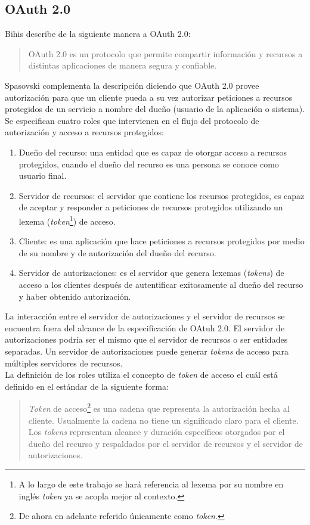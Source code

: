 \subsection{OAuth 2.0}\label{sec:oauth}
Bihis describe de la siguiente manera a OAuth 2.0:
\begin{quote}
	OAuth 2.0 es un protocolo que permite compartir información y recursos a distintas aplicaciones de manera segura y confiable\cite{MasteringOAuth2}.
\end{quote}
Spasovski complementa la descripción diciendo que OAuth 2.0 provee autorización para que un cliente pueda a su vez autorizar peticiones a recursos protegidos de un servicio a nombre del dueño (usuario de la aplicación o sistema)\cite{OAuth2Identity}.
Se especifican cuatro roles que intervienen en el flujo del protocolo de autorización y acceso a recursos protegidos\cite{OAuthRFC}:
\begin{enumerate}
	\item Dueño del recurso: una entidad que es capaz de otorgar acceso a recursos protegidos, cuando el dueño del recurso es una persona se conoce como usuario final.
	\item Servidor de recursos: el servidor que contiene los recursos protegidos, es capaz de aceptar y responder a peticiones de recursos protegidos utilizando un lexema (\textit{token}\footnote{A lo largo de este trabajo se hará referencia al lexema por su nombre en inglés \textit{token} ya se acopla mejor al contexto.}) de acceso.
	\item Cliente: es una aplicación que hace peticiones a recursos protegidos por medio de su nombre y de autorización del dueño del recurso.
	\item Servidor de autorizaciones: es el servidor que genera lexemas (\textit{tokens}) de acceso a los clientes después de autentificar exitosamente al dueño del recurso y haber obtenido autorización.
\end{enumerate}
La interacción entre el servidor de autorizaciones y el servidor de recursos se encuentra fuera del alcance de la especificación de OAtuh 2.0. El servidor de autorizaciones podría ser el mismo que el servidor de recursos o ser entidades separadas. Un servidor de autorizaciones puede generar \textit{tokens} de acceso para múltiples servidores de recursos\cite{OAuthRFC}.\\
La definición de los roles utiliza el concepto de \textit{token} de acceso el cuál está definido en el estándar de la siguiente forma\cite{OAuthRFC}:
\begin{quote}
	\textit{Token} de acceso\footnote{De ahora en adelante referido únicamente como \textit{token}.} es una cadena que representa la autorización hecha al cliente. Usualmente la cadena no tiene un significado claro para el cliente. Los \textit{tokens} representan alcance y duración específicos otorgados por el dueño del recurso y respaldados por el servidor de recursos y el servidor de autorizaciones.
\end{quote}

